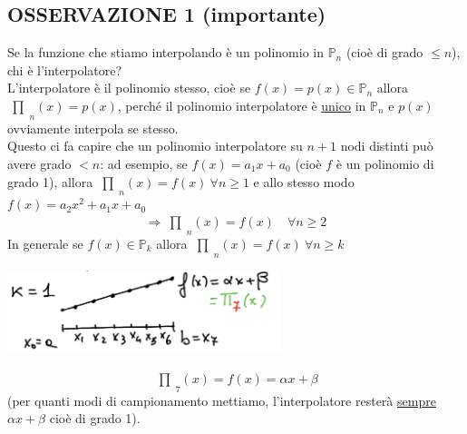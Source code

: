 \documentclass[12pt,headings=optiontohead]{article}
\newcommand{\inter}{\begin{matrix}\prod\end{matrix}}
\begin{document}
\subsection{OSSERVAZIONE 1 (importante)}
Se la funzione che stiamo interpolando è un polinomio in $\mathbb{P}_n$ (cioè di grado $\leq n$), chi è l'interpolatore?\\
L'interpolatore è il polinomio stesso, cioè se $f(x) = p(x) \in \mathbb{P}_n$ allora $\inter_n(x) = p(x)$, perché il polinomio interpolatore è \uline{unico} in $\mathbb{P}_n$ e
$p(x)$ ovviamente interpola se stesso.\\
Questo ci fa capire che un polinomio interpolatore su $n+1$ nodi distinti può avere grado $<n$: ad esempio, se $f(x) = a_1x + a_0$ (cioè $f$ è un polinomio di grado 1), allora $\inter_n(x) = f(x) \ \forall n \ge 1$ e allo stesso modo $f(x) = a_2x^2 + a_1x + a_0$
\[\Longrightarrow \inter_n(x) = f(x) \quad \forall n \ge 2\]
In generale se $f(x) \in \mathbb{P}_k$ allora $\inter_n(x) = f(x) \ \forall n \ge k$
\begin{center}
    \includegraphics[width=0.6\textwidth]{lez12_img2.png}
\end{center}
\[\inter_7(x) = f(x) = \alpha x + \beta\]
(per quanti modi di campionamento mettiamo, l'interpolatore resterà \uline{sempre} $\alpha x + \beta$ cioè di grado 1).
\end{document}

